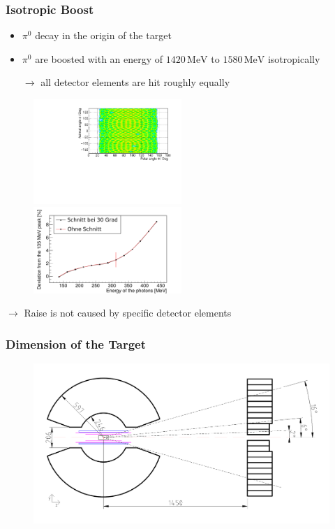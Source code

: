 \documentclass[slidestop,compress,mathserif]{beamer}
\begin{document}
\begin{frame}
	\frametitle{Isotropic Boost}
	\begin{itemize}
		\item $\pi^0$ decay in the origin of the target
		\item $\pi^0$ are boosted with an energy of $ 1420\, \text{MeV}$ to $1580\, \text{MeV}$ isotropically
		
		$\rightarrow$ all detector elements are hit roughly equally 
	\end{itemize}
	
	\begin{figure}
		\includegraphics[width=0.50\textwidth]{Pictures/20171204DistributionPhotonUrsprungIsotrop}
		\includegraphics[width=0.50\textwidth]{Pictures/20172804IsotropUrpsprungDeviation}
	
	\end{figure}
$\rightarrow$ Raise is not caused by specific detector elements
\end{frame}

\begin{frame}
	\frametitle{Dimension of the Target}
	\begin{figure}

		
	\includegraphics[width=1.00\textwidth]{Pictures/cbtaps_side.pdf}
	\end{figure}
	
	
\end{frame}
\end{document}
